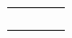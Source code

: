 \begin{table}[!ht]
\begin{tabularx}{\textwidth}{|p{3cm}|K{4cm}|K{3cm}|K{4cm}|}
		&                                                                    &                                                         &                                                                                                                                                                   \\ \hline
		&                                                                    &                                                         &                                                                                                                                                                   \\ \hline
		&                                                                    &                                                         &                                                                                                                                                                   \\ \hline
		&                                                                    &                                                         &                                                                                                                                                                   \\ \hline
		&                                                                    &                                                         &                                                                                                                                                                   \\ \hline
	\end{tabularx}
\end{table}




